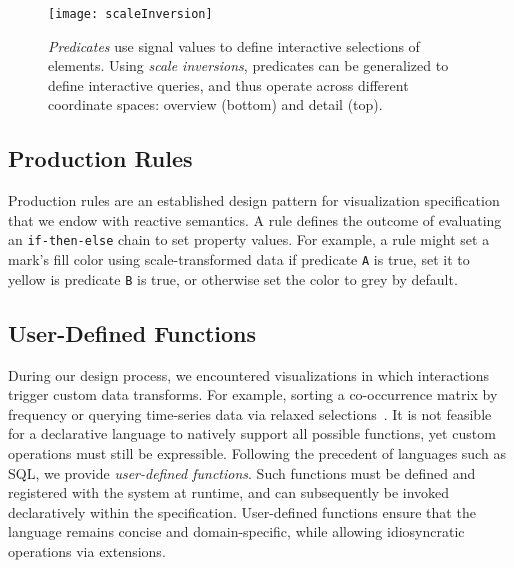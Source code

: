\newpage
\begin{figure}[h!]
  \centering
  \texttt{[image: scaleInversion]}
  \caption{\emph{Predicates} use signal values to define interactive selections
of elements. Using \emph{scale inversions}, predicates can be generalized to
define interactive queries, and thus operate across different coordinate spaces:
overview (bottom) and detail (top).}
  \label{fig:vg:scaleInversion}
\end{figure}


\subsection{Production Rules}

\vspace{-10pt}

Production rules are an established design pattern for visualization
specification~\cite{heer:designpatterns} that we endow with reactive semantics.
A rule defines the outcome of evaluating an \texttt{if-then-else} chain to set
property values. For example, a rule might set a mark's fill color using
scale-transformed data if predicate \texttt{A} is true, set it to yellow is
predicate \texttt{B} is true, or otherwise set the color to grey by default.

\vspace{-10pt}

\subsection{User-Defined Functions}
\label{sec:udfs}

\vspace{-10pt}

During our design process, we encountered visualizations in which interactions
trigger custom data transforms. For example, sorting a co-occurrence matrix by
frequency or querying time-series data via relaxed
selections~\cite{holz:relaxed}. It is not feasible for a declarative language to
natively support all possible functions, yet custom operations must still be
expressible. Following the precedent of languages such as SQL, we provide
\emph{user-defined functions}. Such functions must be defined and registered
with the system at runtime, and can subsequently be invoked declaratively within
the specification. User-defined functions ensure that the language remains
concise and domain-specific, while allowing idiosyncratic operations via
extensions.

